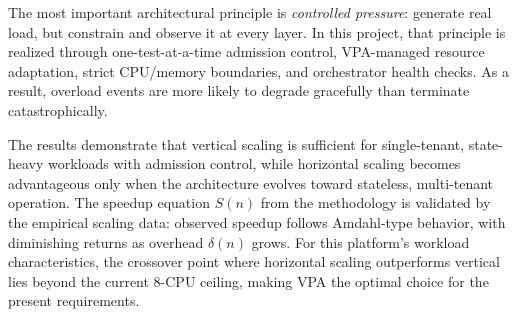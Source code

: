 \documentclass[11pt,a4paper]{article}
\begin{document}
The most important architectural principle is \emph{controlled pressure}: generate real load, but constrain and observe it at every layer. In this project, that principle is realized through one-test-at-a-time admission control, VPA-managed resource adaptation, strict CPU/memory boundaries, and orchestrator health checks. As a result, overload events are more likely to degrade gracefully than terminate catastrophically.

The results demonstrate that vertical scaling is sufficient for single-tenant, state-heavy workloads with admission control, while horizontal scaling becomes advantageous only when the architecture evolves toward stateless, multi-tenant operation. The speedup equation $S(n)$ from the methodology is validated by the empirical scaling data: observed speedup follows Amdahl-type behavior, with diminishing returns as overhead $\delta(n)$ grows. For this platform's workload characteristics, the crossover point where horizontal scaling outperforms vertical lies beyond the current 8-CPU ceiling, making VPA the optimal choice for the present requirements.
\end{document}
